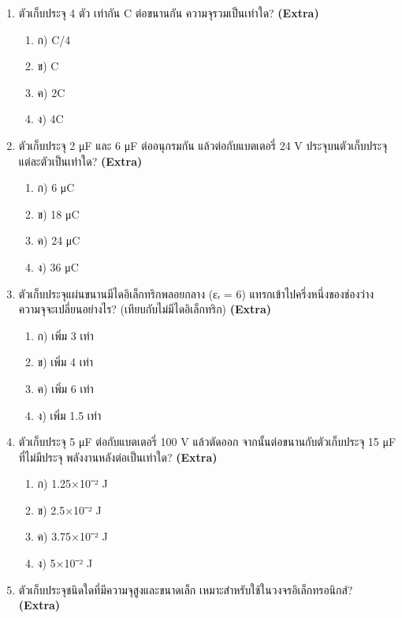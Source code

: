 \documentclass[12pt]{article}
\begin{document}
\begin{enumerate}[label=\arabic*.]
\begin{enumerate}[label=)]
\item ก) คงที่
\item ข) เพิ่มขึ้น
\item ค) ลดลง
\item ง) เป็นศูนย์
\end{enumerate}
\item ตัวเก็บประจุ 4 ตัว เท่ากัน C ต่อขนานกัน ความจุรวมเป็นเท่าใด? \hfill \textbf{\small (Extra)}
\begin{enumerate}[label=)]
\item ก) C/4
\item ข) C
\item ค) 2C
\item ง) 4C
\end{enumerate}
\item ตัวเก็บประจุ 2 μF และ 6 μF ต่ออนุกรมกัน แล้วต่อกับแบตเตอรี่ 24 V ประจุบนตัวเก็บประจุแต่ละตัวเป็นเท่าใด? \hfill \textbf{\small (Extra)}
\begin{enumerate}[label=)]
\item ก) 6 μC
\item ข) 18 μC
\item ค) 24 μC
\item ง) 36 μC
\end{enumerate}
\item ตัวเก็บประจุแผ่นขนานมีไดอิเล็กทริกพลอยกลาง (εᵣ = 6) แทรกเข้าไปครึ่งหนึ่งของช่องว่าง ความจุจะเปลี่ยนอย่างไร? (เทียบกับไม่มีไดอิเล็กทริก) \hfill \textbf{\small (Extra)}
\begin{enumerate}[label=)]
\item ก) เพิ่ม 3 เท่า
\item ข) เพิ่ม 4 เท่า
\item ค) เพิ่ม 6 เท่า
\item ง) เพิ่ม 1.5 เท่า
\end{enumerate}
\item ตัวเก็บประจุ 5 μF ต่อกับแบตเตอรี่ 100 V แล้วตัดออก จากนั้นต่อขนานกับตัวเก็บประจุ 15 μF ที่ไม่มีประจุ พลังงานหลังต่อเป็นเท่าใด? \hfill \textbf{\small (Extra)}
\begin{enumerate}[label=)]
\item ก) 1.25×10⁻² J
\item ข) 2.5×10⁻² J
\item ค) 3.75×10⁻² J
\item ง) 5×10⁻² J
\end{enumerate}
\item ตัวเก็บประจุชนิดใดที่มีความจุสูงและขนาดเล็ก เหมาะสำหรับใช้ในวงจรอิเล็กทรอนิกส์? \hfill \textbf{\small (Extra)}

\end{enumerate}
\end{document}
